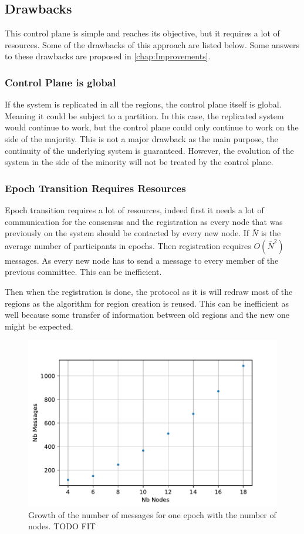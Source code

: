 \documentclass[a4paper,11pt,oneside]{report}
\begin{document}
\subsection{Drawbacks}
This control plane is simple and reaches its objective, but it requires a lot of
resources. Some of the drawbacks of this approach are listed below. 
Some answers to these drawbacks are proposed in \autoref{chap:Improvements}.  

\subsubsection{Control Plane is global}
If the system is replicated in all the regions, the control plane itself is
global. Meaning it could be subject to a partition. In this case, the replicated
system would continue to work, but the control plane could only continue to
work on the side of the majority. This is not a major drawback as the main
purpose, the continuity of the underlying system is guaranteed. However, the
evolution of the system in the side of the minority will not be treated by the
control plane.

\subsubsection{Epoch Transition Requires Resources}
Epoch transition requires a lot of resources, indeed first it needs a lot of
communication for the consensus and the registration as every node that was
previously on the system should be contacted by every new node. If $\bar{N}$ is
the average number of participants in epochs. Then registration 
requires $O(\bar{N}^2)$ messages. As every new node has to send a message
to every member of the previous committee. This can be inefficient. 

Then when the registration is done, the protocol as it is will redraw most of
the regions as the algorithm for region creation is reused. This can be
inefficient as well because some transfer of information between old regions
and the new one might be expected.

\begin{figure}[!h] 
\centering
\includegraphics[width=350pt]{figures/messages-plot}
\caption{Growth of the number of messages for one epoch with the number of nodes. \color{red} TODO FIT \color{black}}
\label{fig:messages-plot}
\end{figure}
\end{document}
